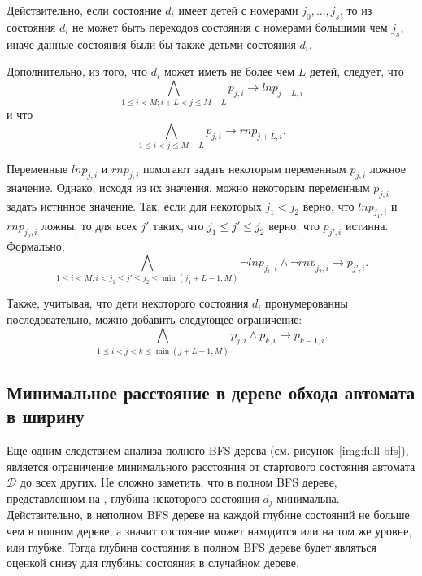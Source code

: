 Действительно, если состояние $d_{i}$ имеет детей с номерами $j_{0},\ldots,j_{s}$, то из состояния $d_{i}$ не может быть переходов состояния с номерами б\emph{о}льшими чем $j_{s}$, иначе данные состояния были бы также детьми состояния $d_{i}$. 

Дополнительно, из того, что $d_{i}$ может иметь не более чем $L$ детей, следует, что
\begin{equation*}
\bigwedge_{1 \leq i < M; i + L < j \leq M - L} p_{j,i} \rightarrow \mathit{lnp}_{j - L, i}
\end{equation*}
и что
\begin{equation*}
\bigwedge_{1 \leq i < j \leq M - L} p_{j,i} \rightarrow \mathit{rnp}_{j + L, i}.
\end{equation*}


Переменные $\mathit{lnp}_{j,i}$ и $\mathit{rnp}_{j,i}$ помогают задать некоторым переменным $p_{j,i}$ ложное значение.
Однако, исходя из их значения, можно некоторым переменным $p_{j,i}$ задать истинное значение.
Так, если для некоторых $j_{1} < j_{2}$ верно, что $\mathit{lnp}_{j_{1}, i}$ и $\mathit{rnp}_{j_{2}, i}$ ложны, то для всех $j'$ таких, что $j_{1} \leq j' \leq j_{2}$ верно, что $p_{j',i}$ истинна.
Формально,
\begin{equation*}
\bigwedge_{1 \leq i < M;i < j_{1} \leq j' \leq j_{2} \leq \min\left(j_{1} + L - 1, M\right)} \neg \mathit{lnp}_{j_{1},i} \wedge \neg \mathit{rnp}_{j_{2},i} \rightarrow p_{j',i}.
\end{equation*}


Также, учитывая, что дети некоторого состояния $d_{i}$ пронумерованны последовательно, можно добавить следующее ограничение:
\begin{equation*}
\bigwedge_{1 \leq i < j < k \leq \min(j + L - 1, M)} p_{j,i} \wedge p_{k,i} \rightarrow p_{k - 1, i}.
\end{equation*}



\subsection{Минимальное расстояние в дереве обхода автомата в ширину}
\label{sec:space:pruning:bfs-distance}

Еще одним следствием анализа полного BFS дерева (см. рисунок~\ref{img:full-bfs}), является ограничение минимального расстояния от стартового состояния автомата $\mathcal{D}$ до всех других.
Не сложно заметить, что в полном BFS дереве, представленном на , глубина некоторого состояния $d_{j}$ минимальна.
Действительно, в неполном BFS дереве на каждой глубине состояний не больше чем в полном дереве, а значит состояние может находится или на том же уровне, или глубже. 
Тогда глубина состояния в полном BFS дереве будет являться оценкой снизу для глубины состояния в случайном дереве.

